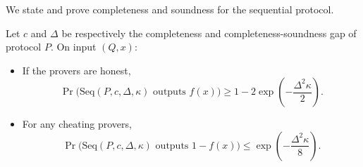 \documentclass{toc}
\begin{document}
\noindent We state and prove completeness and soundness for the sequential protocol.

\begin{theorem}
  Let $c$ and $\Delta$ be respectively %
%
the completeness and completeness-soundness gap
of %
protocol $P$.
On input $(Q,x)$:
\begin{itemize}
\item If the provers are honest, $$ \Pr\big(\mbox{Seq}(P, c, \Delta, \kappa) \mbox{  outputs } f(x)\big) \geq 1 - 2\exp \left(-\frac{\Delta^2\kappa}{2}\right) .$$ 
\item For any cheating provers, $$\Pr\big(\mbox{Seq}(P, c, \Delta, \kappa) \mbox{  outputs } 1-f(x)\big) \leq \exp \left(-\frac{\Delta^2\kappa}{8}\right) .$$
\end{itemize}

\end{theorem}
\end{document}
